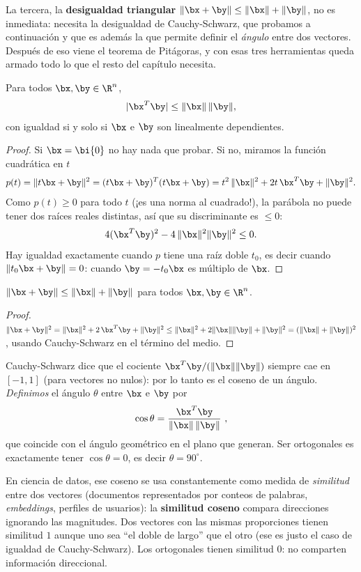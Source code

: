La tercera, la \textbf{desigualdad triangular}
$\|\bx+\by\|\le\|\bx\|+\|\by\|$, no es inmediata: necesita la desigualdad de
Cauchy-Schwarz, que probamos a continuación y que es además la que permite
definir el \emph{ángulo} entre dos vectores. Después de eso viene el teorema
de Pitágoras, y con esas tres herramientas queda armado todo lo que el resto
del capítulo necesita.

\begin{teorema}\label{teo:cauchy-schwarz}
Para todos $\bx,\by\in\R^n$,
\[
|\bx^T\by|\le\|\bx\|\,\|\by\| ,
\]
con igualdad si y solo si $\bx$ e $\by$ son linealmente dependientes.
\end{teorema}

\begin{proof}
Si $\bx=\bi{0}$ no hay nada que probar. Si no, miramos la función
cuadrática en $t$
\[
p(t)=\|t\bx+\by\|^2=(t\bx+\by)^T(t\bx+\by)
=t^2\,\|\bx\|^2+2t\,\bx^T\by+\|\by\|^2 .
\]
Como $p(t)\ge0$ para todo $t$ (¡es una norma al cuadrado!), la parábola no
puede tener dos raíces reales distintas, así que su discriminante es
$\le 0$:
\[
4(\bx^T\by)^2-4\,\|\bx\|^2\|\by\|^2\le 0 .
\]
Hay igualdad exactamente cuando $p$ tiene una raíz doble $t_0$, es decir
cuando $\|t_0\bx+\by\|=0$: cuando $\by=-t_0\bx$ es múltiplo de $\bx$.
\end{proof}

\begin{proposicion}
$\|\bx+\by\|\le\|\bx\|+\|\by\|$ para todos $\bx,\by\in\R^n$.
\end{proposicion}

\begin{proof}
$\|\bx+\by\|^2=\|\bx\|^2+2\,\bx^T\by+\|\by\|^2
\le\|\bx\|^2+2\|\bx\|\|\by\|+\|\by\|^2=(\|\bx\|+\|\by\|)^2$,
usando Cauchy-Schwarz en el término del medio.
\end{proof}

Cauchy-Schwarz dice que el cociente $\bx^T\by/(\|\bx\|\|\by\|)$
siempre cae en $[-1,1]$ (para vectores no nulos): por lo tanto es el coseno
de un ángulo. \emph{Definimos} el ángulo $\theta$ entre $\bx$ e $\by$ por
\[
\cos\theta=\frac{\bx^T\by}{\|\bx\|\,\|\by\|}\ ,
\]
que coincide con el ángulo geométrico en el plano que generan. Ser
ortogonales es exactamente tener $\cos\theta=0$, es decir
$\theta=90^{\circ}$.

\begin{observacion}
En ciencia de datos, ese coseno se usa constantemente como medida de
\emph{similitud} entre dos vectores (documentos representados por conteos
de palabras, \emph{embeddings}, perfiles de usuarios): la
\textbf{similitud coseno} compara direcciones ignorando las magnitudes.
Dos vectores con las mismas proporciones tienen similitud $1$ aunque uno
sea ``el doble de largo'' que el otro (ese es justo el caso de igualdad
de Cauchy-Schwarz). Los ortogonales tienen similitud $0$: no comparten
información direccional.
\end{observacion}

